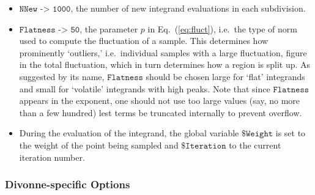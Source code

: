 \documentclass[12pt]{article}
\newcommand\ie{i.e.\ }
\newcommand\Code[1]{\ensuremath{\texttt{#1}}}
\newcommand\Option[2]{\item\Code{#1 -> #2},}
\begin{document}
\begin{itemize}
\Option{NNew}{1000}
the number of new integrand evaluations in each subdivision.

\Option{Flatness}{50}
the parameter $p$ in Eq.~(\ref{eq:fluct}), \ie the type of norm used to
compute the fluctuation of a sample.  This determines how prominently
`outliers,' \ie individual samples with a large fluctuation, figure in
the total fluctuation, which in turn determines how a region is split
up.  As suggested by its name, \Code{Flatness} should be chosen large
for `flat' integrands and small for `volatile' integrands with high
peaks.  Note that since \Code{Flatness} appears in the exponent, one
should not use too large values (say, no more than a few hundred) lest
terms be truncated internally to prevent overflow.

\item
During the evaluation of the integrand, the global variable
\Code{\$Weight} is set to the weight of the point being sampled and
\Code{\$Iteration} to the current iteration number.
\end{itemize}


\subsubsection{Divonne-specific Options}
\end{document}
